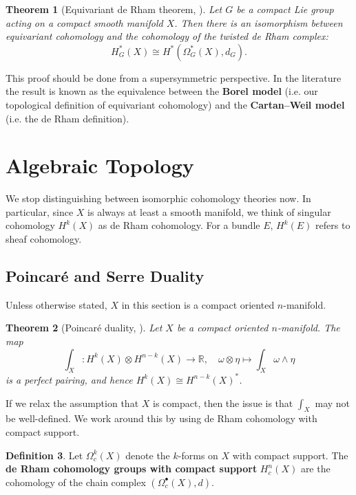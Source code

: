 \documentclass{report}
\theoremstyle{plain}
\newtheorem{theorem}{Theorem}[section]
\theoremstyle{definition}
\newtheorem{definition}[theorem]{Definition}
\theoremstyle{remark}
\newcommand{\bR}{\mathbb{R}}
\begin{document}
\begin{theorem}[Equivariant de Rham theorem, {\cite[Section 0.2]{Guillemin1999}}]
  Let $G$ be a compact Lie group acting on a compact smooth manifold
  $X$. Then there is an isomorphism between equivariant cohomology and
  the cohomology of the twisted de Rham complex:
  \[ H^*_G(X) \cong H^*(\Omega^*_G(X), d_G). \]
\end{theorem}

This proof should be done from a supersymmetric perspective. In the
literature the result is known as the equivalence between the {\bf
  Borel model} (i.e. our topological definition of equivariant
cohomology) and the {\bf Cartan--Weil model} (i.e. the de Rham
definition).

\section{Algebraic Topology}

We stop distinguishing between isomorphic cohomology theories now. In
particular, since $X$ is always at least a smooth manifold, we think
of singular cohomology $H^k(X)$ as de Rham cohomology. For a bundle
$E$, $H^k(E)$ refers to sheaf cohomology.

\subsection{Poincar\'e and Serre Duality}

Unless otherwise stated, $X$ in this section is a compact oriented
$n$-manifold.

\begin{theorem}[Poincar\'e duality, \cite{Bott1982}]
  Let $X$ be a compact oriented $n$-manifold. The map
  \[ \int_X\colon H^k(X) \otimes H^{n-k}(X) \to \bR, \quad \omega \otimes \eta \mapsto \int_X \omega \wedge \eta \]
  is a perfect pairing, and hence $H^k(X) \cong H^{n-k}(X)^*$.
\end{theorem}

If we relax the assumption that $X$ is compact, then the issue is that
$\int_X$ may not be well-defined. We work around this by using
de Rham cohomology with compact support.

\begin{definition}
  Let $\Omega_c^k(X)$ denote the $k$-forms on $X$ with compact
  support. The {\bf de Rham cohomology groups with compact support}
  $H^n_c(X)$ are the cohomology of the chain complex
  $(\Omega_c^\bullet(X), d)$.
\end{definition}
\end{document}
